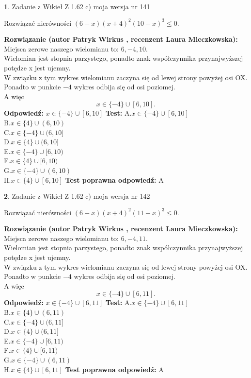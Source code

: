 \documentclass[12pt, a4paper]{article}
\theoremstyle{definition} %
\newtheorem{zad}{}
\newcommand{\zadStart}[1]{\begin{zad}#1\newline}
\newcommand{\zadStop}{\end{zad}}
\newcommand{\rozwStart}[2]{\noindent \textbf{Rozwiązanie (autor #1 , recenzent #2): }\newline}
\newcommand{\rozwStop}{\newline}
\newcommand{\odpStart}{\noindent \textbf{Odpowiedź:}\newline}
\newcommand{\odpStop}{\newline}
\newcommand{\testStart}{\noindent \textbf{Test:}\newline}
\newcommand{\testStop}{\newline}
\newcommand{\kluczStart}{\noindent \textbf{Test poprawna odpowiedź:}\newline}
\newcommand{\kluczStop}{\newline}
\begin{document}
\zadStart{Zadanie z Wikieł Z 1.62 c) moja wersja nr 141}

Rozwiązać nierówności $(6-x)(x+4)^{2}(10-x)^{3}\le0$.
\zadStop
\rozwStart{Patryk Wirkus}{Laura Mieczkowska}
Miejsca zerowe naszego wielomianu to: $6, -4, 10$.\\
Wielomian jest stopnia parzystego, ponadto znak współczynnika przy\linebreak najwyższej potędze x jest ujemny.\\ W związku z tym wykres wielomianu zaczyna się od lewej strony powyżej osi OX.\\
Ponadto w punkcie $-4$ wykres odbija się od osi poziomej.\\
A więc $$x \in \{-4\} \cup [6,10].$$
\rozwStop
\odpStart
$x \in \{-4\} \cup [6,10]$
\odpStop
\testStart
A.$x \in \{-4\} \cup [6,10]$\\
B.$x \in \{4\} \cup (6,10)$\\
C.$x \in \{-4\} \cup (6,10]$\\
D.$x \in \{4\} \cup (6,10]$\\
E.$x \in \{-4\} \cup [6,10)$\\
F.$x \in \{4\} \cup [6,10)$\\
G.$x \in \{-4\} \cup (6,10)$\\
H.$x \in \{4\} \cup [6,10]$
\testStop
\kluczStart
A
\kluczStop



\zadStart{Zadanie z Wikieł Z 1.62 c) moja wersja nr 142}

Rozwiązać nierówności $(6-x)(x+4)^{2}(11-x)^{3}\le0$.
\zadStop
\rozwStart{Patryk Wirkus}{Laura Mieczkowska}
Miejsca zerowe naszego wielomianu to: $6, -4, 11$.\\
Wielomian jest stopnia parzystego, ponadto znak współczynnika przy\linebreak najwyższej potędze x jest ujemny.\\ W związku z tym wykres wielomianu zaczyna się od lewej strony powyżej osi OX.\\
Ponadto w punkcie $-4$ wykres odbija się od osi poziomej.\\
A więc $$x \in \{-4\} \cup [6,11].$$
\rozwStop
\odpStart
$x \in \{-4\} \cup [6,11]$
\odpStop
\testStart
A.$x \in \{-4\} \cup [6,11]$\\
B.$x \in \{4\} \cup (6,11)$\\
C.$x \in \{-4\} \cup (6,11]$\\
D.$x \in \{4\} \cup (6,11]$\\
E.$x \in \{-4\} \cup [6,11)$\\
F.$x \in \{4\} \cup [6,11)$\\
G.$x \in \{-4\} \cup (6,11)$\\
H.$x \in \{4\} \cup [6,11]$
\testStop
\kluczStart
A
\kluczStop
\end{document}
